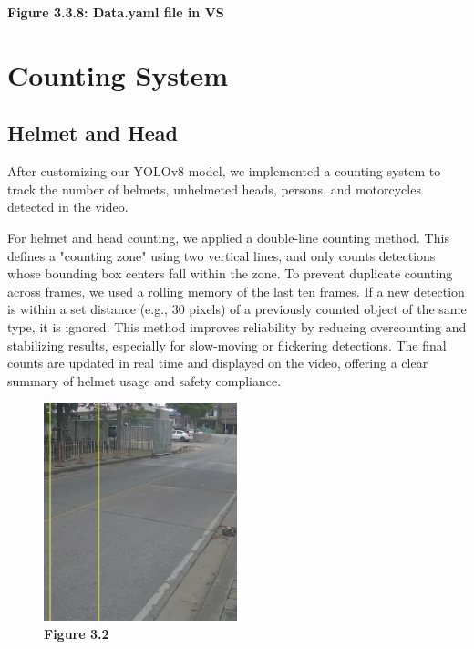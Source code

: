 \begin{itemize}
\begin{center}
	 	\vspace{0.5em}
	 	\textbf{Figure 3.3.8:  Data.yaml file in VS}
	 \end{center}
\end{itemize}

\section{\textbf{Counting System}}
\subsection{Helmet and Head}

	\noindent\hspace{2.5em}After customizing our YOLOv8 model, we implemented a counting system to track the number of helmets, unhelmeted heads, persons, and motorcycles detected in the video.
	
	
	\noindent\hspace{2.5em}For helmet and head counting, we applied a double-line counting method. This defines a "counting zone" using two vertical lines, and only counts detections whose bounding box centers fall within the zone. To prevent duplicate counting across frames, we used a rolling memory of the last ten frames. If a new detection is within a set distance (e.g., 30 pixels) of a previously counted object of the same type, it is ignored.
	\newline
	This method improves reliability by reducing overcounting and stabilizing results, especially for slow-moving or flickering detections. The final counts are updated in real time and displayed on the video, offering a clear summary of helmet usage and safety compliance.
	\begin{figure}[H] %
		\centering
		\includegraphics[width=0.5\textwidth]{headhel1.png}
		\vspace{0.5em}
		\caption*{\textbf{Figure 3.2}}
	\end{figure}
	\hfill

